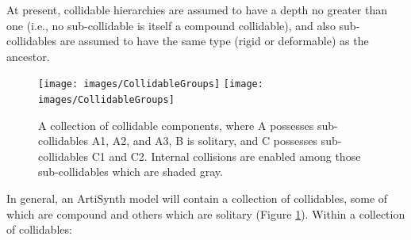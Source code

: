 \begin{sideblock}
At present, collidable hierarchies are assumed to have a depth no
greater than one (i.e., no sub-collidable is itself a compound
collidable), and also sub-collidables are assumed to have the same
type (rigid or deformable) as the ancestor.
\end{sideblock}

\begin{figure}[ht]
\begin{center}
 \iflatexml
   \texttt{[image: images/CollidableGroups]}
 \else
   \texttt{[image: images/CollidableGroups]}
 \fi
\end{center}
\caption{A collection of collidable components, where A possesses
sub-collidables A1, A2, and A3, B is solitary, and C possesses
sub-collidables C1 and C2. Internal collisions are enabled among those
sub-collidables which are shaded gray.}
\label{CollidableGroups:fig}
\end{figure}

In general, an ArtiSynth model will contain a collection of
collidables, some of which are compound and others which are
solitary (Figure \ref{CollidableGroups:fig}).  Within a collection of
collidables:

